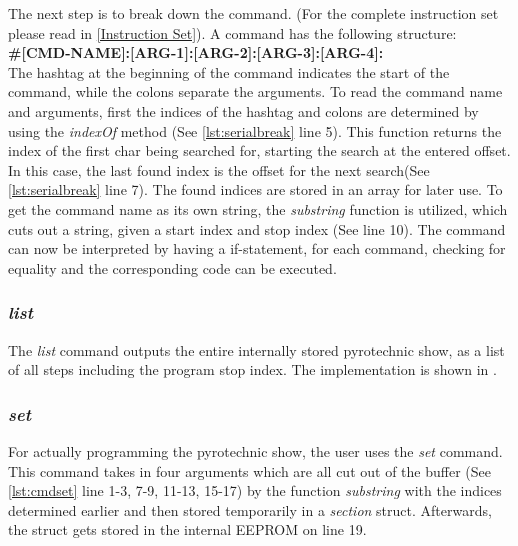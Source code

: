 


\noindent The next step is to break down the command. (For the complete instruction set please read in \cref{Instruction Set}). A command has the following structure:\\

\noindent \textbf{\#[CMD-NAME]:[ARG-1]:[ARG-2]:[ARG-3]:[ARG-4]:}\\

\noindent The hashtag at the beginning of the command indicates the start of the command, while the colons separate  the arguments. To read the command name and arguments, first the indices of the hashtag and colons are determined by using the \textit{indexOf} method (See \cref{lst:serialbreak} line 5). This function returns the index of the first char being searched for, starting the search at the entered offset. In this case, the last found index is the offset for the next search(See \cref{lst:serialbreak} line 7). The found indices are stored in an array for later use. To get the command name as its own string, the \textit{substring} function is utilized, which cuts out a string, given a start index and stop index (See line 10). The command can now be interpreted by having a if-statement, for each command, checking for equality and the corresponding code can be executed.\\

\pagebreak

\subsubsection{\textit{list}}
The \textit{list} command outputs the entire internally stored pyrotechnic show, as a list of all steps including the program stop index. The implementation is shown in .  
 



\subsubsection{\textit{set}}
For actually programming the pyrotechnic show, the user uses the \textit{set} command. This command takes in four arguments which are all cut out of the buffer (See \cref{lst:cmdset} line 1-3, 7-9, 11-13, 15-17) by the function \textit{substring} with the indices determined earlier and then stored temporarily in a \textit{section} struct. Afterwards, the struct gets stored in the internal EEPROM on line 19.

